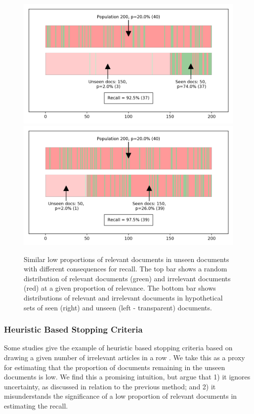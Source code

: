 \documentclass{bmcart}
\begin{document}
\begin{figure}
	\includegraphics[width=\linewidth]{../images/proportions_1.png}
	\includegraphics[width=\linewidth]{../images/proportions_2.png}
	\caption{Similar low proportions of relevant documents in unseen documents with different consequences for recall. The top bar shows a random distribution of relevant documents (green) and irrelevant documents (red) at a given proportion of relevance. The bottom bar  shows distributions of relevant and irrelevant documents in hypothetical sets of seen (right) and unseen (left - transparent) documents.}
	\label{unseen-proportions}
\end{figure}


		
\subsubsection*{Heuristic Based Stopping Criteria}

Some studies give the example of heuristic based stopping criteria based on drawing a given number of irrelevant articles in a row \cite{Jonnalagadda2013, Przybya2018}. 
We take this as a proxy for estimating that the proportion of documents remaining in the unseen documents is low. 
We find this a promising intuition, but argue that 1) it ignores uncertainty, as discussed in relation to the previous method; and 2) it misunderstands the significance of a low proportion of relevant documents in estimating the recall.
\end{document}
